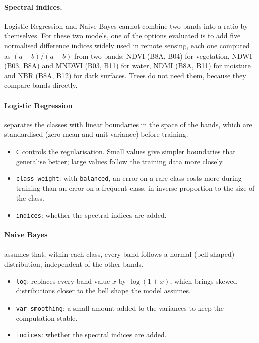 \documentclass[11pt,a4paper]{article}
\begin{document}
\paragraph{Spectral indices.} Logistic Regression and Naive Bayes cannot
combine two bands into a ratio by themselves. For these two models, one of
the options evaluated is to add five normalised difference indices widely used
in remote sensing, each one computed as $(a-b)/(a+b)$ from two bands: NDVI
(B8A, B04) for vegetation, NDWI (B03, B8A) and MNDWI (B03, B11) for water,
NDMI (B8A, B11) for moisture and NBR (B8A, B12) for dark surfaces. Trees do
not need them, because they compare bands directly.

\paragraph{Logistic Regression} separates the classes with linear boundaries
in the space of the bands, which are standardised (zero mean and unit
variance) before training.
\begin{itemize}
  \item \texttt{C} controls the regularisation. Small values give simpler
  boundaries that generalise better; large values follow the training data
  more closely.
  \item \texttt{class\_weight}: with \texttt{balanced}, an error on a rare
  class costs more during training than an error on a frequent class, in
  inverse proportion to the size of the class.
  \item \texttt{indices}: whether the spectral indices are added.
\end{itemize}

\paragraph{Naive Bayes} assumes that, within each class, every band follows a
normal (bell-shaped) distribution, independent of the other bands.
\begin{itemize}
  \item \texttt{log}: replaces every band value $x$ by $\log(1+x)$, which
  brings skewed distributions closer to the bell shape the model assumes.
  \item \texttt{var\_smoothing}: a small amount added to the variances to keep
  the computation stable.
  \item \texttt{indices}: whether the spectral indices are added.
\end{itemize}
\end{document}
